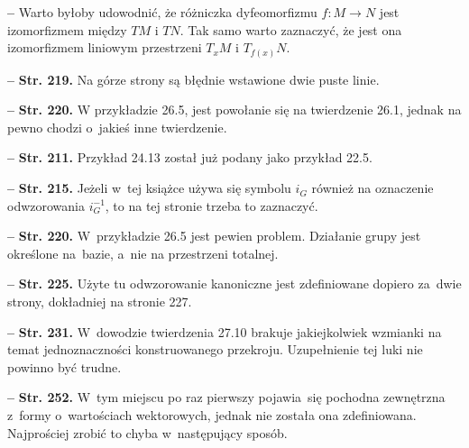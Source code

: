 \documentclass[a4paper,11pt]{article}
\newcommand{\tb}{\textbf}
\newcommand{\noi}{\noindent}
\newcommand{\start}{\noi \tb{--} {}}
\newcommand{\Str}[1]{\tb{Str. #1.}}
\begin{document}
\start Warto byłoby udowodnić, że różniczka dyfeomorfizmu
$f : M \rightarrow N$ jest izomorfizmem między $TM$ i $TN$. Tak samo
warto zaznaczyć, że jest ona izomorfizmem liniowym przestrzeni
$T_{ x }M$ i $T_{ f( x ) }N$.

\start \Str{219} Na górze strony są błędnie wstawione dwie puste
linie.

\start \Str{220} W przykładzie 26.5, jest powołanie się na twierdzenie
26.1, jednak na pewno chodzi o~jakieś inne twierdzenie.

\start \Str{211} Przykład 24.13 został już podany jako przykład 22.5.

\start \Str{215} Jeżeli w~tej książce używa się symbolu $i_{ G }$
również na oznaczenie odwzorowania $i_{ G }^{ -1 }$, to na tej stronie
trzeba to zaznaczyć.

\start \Str{220} W~przykładzie 26.5 jest pewien problem. Działanie
grupy jest określone na~bazie, a~nie na przestrzeni totalnej.

\start \Str{225} Użyte tu odwzorowanie kanoniczne jest zdefiniowane
dopiero za~dwie strony, dokładniej na stronie 227.

\start \Str{231} W~dowodzie twierdzenia 27.10 brakuje jakiejkolwiek
wzmianki na temat jednoznaczności konstruowanego przekroju.
Uzupełnienie tej luki nie powinno być trudne.

\start \Str{252} W~tym miejscu po raz pierwszy pojawia~się pochodna
zewnętrzna z~formy o~wartościach wektorowych, jednak nie została ona
zdefiniowana. Najprościej zrobić to chyba w~następujący sposób.
\end{document}
